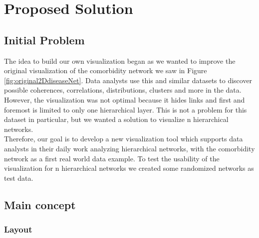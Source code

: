 \chapter{Proposed Solution}

\section{Initial Problem}

The idea to build our own visualization began as we wanted to improve the original visualization of the comorbidity network we saw in Figure \ref{fig:original2DdiseaseNet}. Data analysts use this and similar datasets to discover possible coherences, correlations, distributions, clusters and more in the data. 
However, the visualization was not optimal because it hides links and first and foremost is limited to only one hierarchical layer. This is not a problem for this dataset in particular, but we wanted a solution to visualize n hierarchical networks.\\
Therefore, our goal is to develop a new visualization tool which supports data analysts in their daily work analyzing hierarchical networks, with the comorbidity network as a first real world data example. To test the usability of the visualization for n hierarchical networks we created some randomized networks as test data. 

\section{Main concept}

\subsection{Layout}

